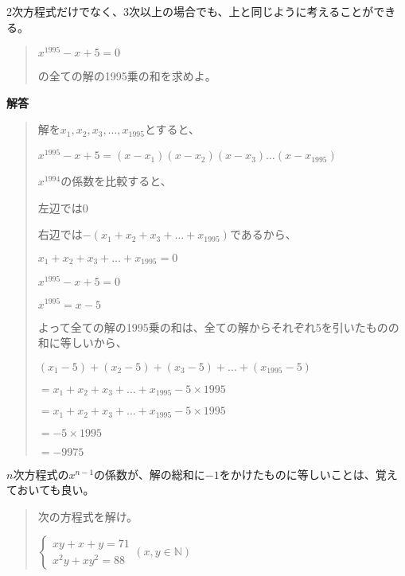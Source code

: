\documentclass[uplatex,fleqn]{jsbook}
\begin{document}
2次方程式だけでなく、3次以上の場合でも、上と同じように考えることができる。

\begin{quote}
    $x^{1995}-x+5=0$

    の全ての解の1995乗の和を求めよ。
\end{quote}

\vspace{15pt} {\large \textbf{解答}}
\begin{quote}
    解を$x_1,x_2,x_3,\dots,x_{1995}$とすると、

    $x^{1995}-x+5=\left(x-x_1\right)\left(x-x_2\right)\left(x-x_3\right)\dots \left(x-x_{1995}\right)$

    $x^{1994}$の係数を比較すると、

    左辺では$0$

    右辺では$-\left(x_1+x_2+x_3+\dots +x_{1995}\right)$であるから、

    $x_1+x_2+x_3+\dots +x_{1995}=0$

    $x^{1995}-x+5=0$

    $x^{1995}=x-5$

    よって全ての解の1995乗の和は、全ての解からそれぞれ5を引いたものの和に等しいから、

    $\left(x_1-5\right)+\left(x_2-5\right)+\left(x_3-5\right)+\dots +\left(x_{1995}-5\right)$

    $=x_1+x_2+x_3+\dots +x_{1995}-5\times 1995$

    $=x_1+x_2+x_3+\dots +x_{1995}-5\times 1995$

    $=-5\times 1995$

    $=-9975$
\end{quote}
$n$次方程式の$x^{n-1}$の係数が、解の総和に$-1$をかけたものに等しいことは、覚えておいても良い。

\begin{quote}
    次の方程式を解け。

    \begin{math}
        \begin{cases}
            xy+x+y=71\\
            x^2y+xy^2=88
        \end{cases}
        \left(x,y\in\mathbb{N}\right)
    \end{math}
\end{quote}
\end{document}
